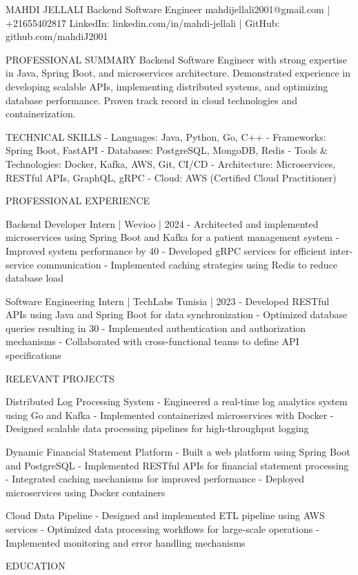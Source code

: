 MAHDI JELLALI
Backend Software Engineer
mahdijellali2001@gmail.com | +21655402817
LinkedIn: linkedin.com/in/mahdi-jellali | GitHub: github.com/mahdiJ2001

PROFESSIONAL SUMMARY
Backend Software Engineer with strong expertise in Java, Spring Boot, and microservices architecture. Demonstrated experience in developing scalable APIs, implementing distributed systems, and optimizing database performance. Proven track record in cloud technologies and containerization.

TECHNICAL SKILLS
- Languages: Java, Python, Go, C++
- Frameworks: Spring Boot, FastAPI
- Databases: PostgreSQL, MongoDB, Redis
- Tools & Technologies: Docker, Kafka, AWS, Git, CI/CD
- Architecture: Microservices, RESTful APIs, GraphQL, gRPC
- Cloud: AWS (Certified Cloud Practitioner)

PROFESSIONAL EXPERIENCE

Backend Developer Intern | Wevioo | 2024
- Architected and implemented microservices using Spring Boot and Kafka for a patient management system
- Improved system performance by 40%
- Developed gRPC services for efficient inter-service communication
- Implemented caching strategies using Redis to reduce database load

Software Engineering Intern | TechLabs Tunisia | 2023
- Developed RESTful APIs using Java and Spring Boot for data synchronization
- Optimized database queries resulting in 30%
- Implemented authentication and authorization mechanisms
- Collaborated with cross-functional teams to define API specifications

RELEVANT PROJECTS

Distributed Log Processing System
- Engineered a real-time log analytics system using Go and Kafka
- Implemented containerized microservices with Docker
- Designed scalable data processing pipelines for high-throughput logging

Dynamic Financial Statement Platform
- Built a web platform using Spring Boot and PostgreSQL
- Implemented RESTful APIs for financial statement processing
- Integrated caching mechanisms for improved performance
- Deployed microservices using Docker containers

Cloud Data Pipeline
- Designed and implemented ETL pipeline using AWS services
- Optimized data processing workflows for large-scale operations
- Implemented monitoring and error handling mechanisms

EDUCATION

